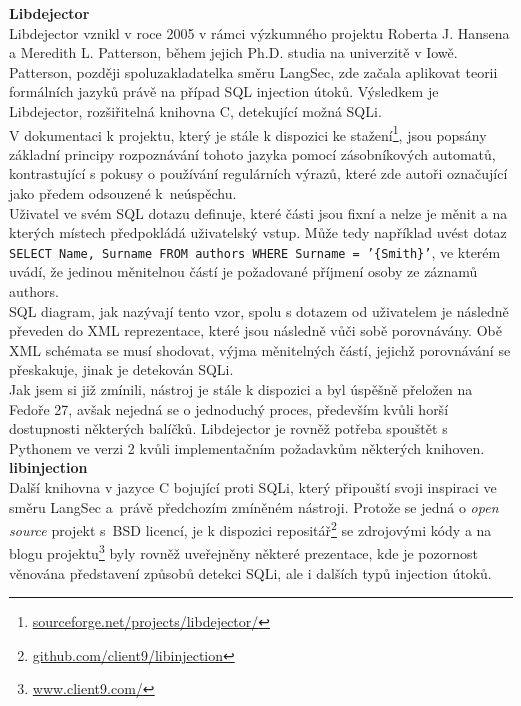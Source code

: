 \Bat{} \textbf{Libdejector} \\
Libdejector vznikl v roce 2005 v rámci výzkumného projektu Roberta J. Hansena a Meredith L. Patterson, během jejich Ph.D. studia na univerzitě v Iowě. 
Patterson, později spoluzakladatelka směru LangSec, zde začala aplikovat teorii formálních jazyků právě na případ SQL injection útoků.
Výsledkem je Libdejector, rozšiřitelná knihovna C, detekující možná SQLi. \\

V dokumentaci k projektu, který je stále k dispozici ke stažení\footnote{\url{sourceforge.net/projects/libdejector/}}, jsou popsány základní principy
rozpoznávání tohoto jazyka pomocí zásobníkových automatů, kontrastující s pokusy o používání regulárních výrazů, které zde autoři označující jako předem odsouzené
k~neúspěchu. \\

Uživatel ve svém SQL dotazu definuje, které části jsou fixní a nelze je měnit a na kterých místech předpokládá uživatelský vstup.
Může tedy například uvést dotaz \texttt{SELECT Name, Surname FROM authors WHERE Surname = '\{Smith\}'}, ve kterém uvádí, že jedinou měnitelnou 
částí je požadované příjmení osoby ze záznamů authors. \\

SQL diagram, jak nazývají tento vzor, spolu s dotazem od uživatelem je následně převeden do XML reprezentace, které jsou následně vůči sobě porovnávány.
Obě XML schémata se musí shodovat, výjma měnitelných částí, jejichž porovnávání se přeskakuje, jinak je detekován SQLi. \\

Jak jsem si již zmínili, nástroj je stále k dispozici a byl úspěšně přeložen na Fedoře 27, avšak nejedná se o jednoduchý proces, především kvůli 
horší dostupnosti některých balíčků. Libdejector je rovněž potřeba spouštět s Pythonem ve verzi 2 kvůli implementačním požadavkům některých knihoven. \\

\newpage
\Bat{} \textbf{libinjection} \\
Další knihovna v jazyce C bojující proti SQLi, který připouští svoji inspiraci ve směru \mbox{LangSec} a~právě předchozím zmíněném nástroji. Protože se jedná 
o \textit{open source} projekt s~BSD licencí, je k dispozici repositář\footnote{\url{github.com/client9/libinjection}} se zdrojovými kódy
a na blogu projektu\footnote{\url{www.client9.com/}} byly rovněž uveřejněny některé prezentace, kde je pozornost věnována představení způsobů detekci 
SQLi, ale i dalších typů injection útoků. \\

